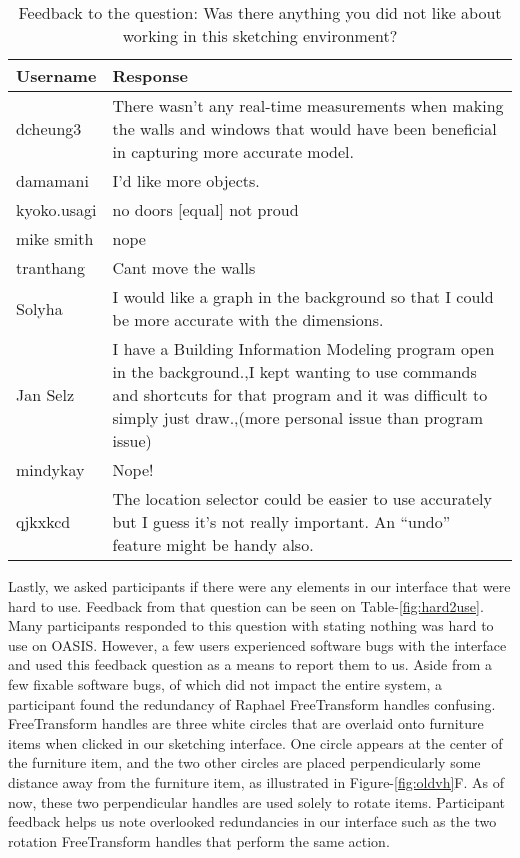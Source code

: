\begin{table}[h]
\centering
\begin{tabular}{|p{}|p{}|}
\hline
\rowcolor[HTML]{EFEFEF} 
\textbf{Username} & \textbf{Response} \\ \hline
dcheung3 & There wasn't any real-time measurements when making the walls and windows that would have been beneficial in capturing more accurate model. \\ \hline
damamani & I'd like more objects. \\ \hline
kyoko.usagi & no doors {[}equal{]} not proud \\ \hline
mike smith & nope \\ \hline
tranthang & Cant move the walls \\ \hline
Solyha & I would like a graph in the background so that I could be more accurate with the dimensions. \\ \hline
Jan Selz & I have a Building Information Modeling program open in the background.,I kept wanting to use commands and shortcuts for that program and it was difficult to simply just draw.,(more personal issue than program issue) \\ \hline
mindykay & Nope! \\ \hline
qjkxkcd & The location selector could be easier to use accurately but I guess it's not really important. An ``undo'' feature might be handy also. \\ \hline
\end{tabular}
\caption{Feedback to the question: Was there anything you did not like about working in this sketching environment?}
\label{fig:dislike}
\end{table}



Lastly, we asked participants if there were any elements in our interface that were hard to use.
Feedback from that question can be seen on Table-\ref{fig:hard2use}.
Many participants responded to this question with stating nothing was hard to use on OASIS.
However, a few users experienced software bugs with the interface and used this feedback question as a means to report them to us.
Aside from a few fixable software bugs, of which did not impact the entire system, a participant found the redundancy of Raphael FreeTransform handles confusing.
FreeTransform handles are three white circles that are overlaid onto furniture items when clicked in our sketching interface.
One circle appears at the center of the furniture item, and the two other circles are placed perpendicularly some distance away from the furniture item, as illustrated in Figure-\ref{fig:oldvh}F.
As of now, these two perpendicular handles are used solely to rotate items.
Participant feedback helps us note overlooked redundancies in our interface such as the two rotation FreeTransform handles that perform the same action.\\

